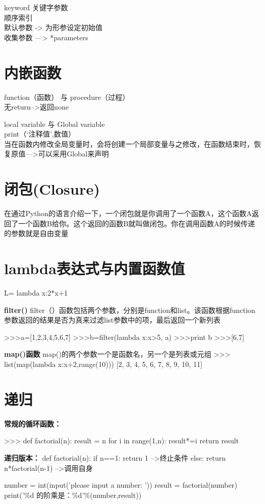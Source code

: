 \documentclass[a4paper,10pt]{ctexart}
\begin{document}

keyword 关键字参数\\
顺序索引\\
默认参数  ->  为形参设定初始值\\
收集参数  —>  *parameters\\

\section{内嵌函数}
function（函数） 与 procedure（过程）\\
无return-->返回none

local variable  与 Global variable\\
print（‘注释值’,数值）\\
当在函数内修改全局变量时，会将创建一个局部变量与之修改，在函数结束时，恢复原值--->可以采用Global来声明

\section{闭包(Closure)}
在通过Python的语言介绍一下，一个闭包就是你调用了一个函数A，这个函数A返回了一个函数B给你。这个返回的函数B就叫做闭包。你在调用函数A的时候传递的参数就是自由变量

\section{lambda表达式与内置函数值}
L= lambda x:2*x+1

\textbf{filter()}
filter（）函数包括两个参数，分别是function和list。该函数根据function参数返回的结果是否为真来过滤list参数中的项，最后返回一个新列表
\begin{python}
>>>a=[1,2,3,4,5,6,7]
>>>b=filter(lambda x:x>5, a)
>>>print b
>>>[6,7]

\textbf{map()函数}
map()的两个参数一个是函数名，另一个是列表或元组
>>> list(map(lambda x:x+2,range(10)))
[2, 3, 4, 5, 6, 7, 8, 9, 10, 11]
\end{python}
\section{递归}

\textbf{常规的循环函数：}
\begin{python}
>>> def factorial(n):
	result = n
	for i in range(1,n):
		result*=i
	return result

\textbf{递归版本：}
def factorial(n):
    if n==1:
        return 1                 -->终止条件
    else:
        return n*factorial(n-1)  -->调用自身

number = int(input('please input a number: '))
result = factorial(number)
print('\%d 的阶乘是：\%d'\%(number,result))
\end{python}
\end{document}
